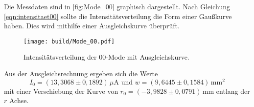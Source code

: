 Die Messdaten sind in \autoref{fig:Mode_00} graphisch dargestellt. Nach Gleichung \ref{eqn:intensitaet00} sollte die Intensitätsverteilung die Form einer Gaußkurve haben. Dies wird mithilfe einer Ausgleichskurve überprüft. 

\begin{figure}[h]
    \centering
    \texttt{[image: build/Mode\_00.pdf]}
    \caption{Intensitätsverteilung der 00-Mode mit Ausgleichskurve.}
    \label{fig:Mode_00}
\end{figure}
Aus der Ausgleichsrechnung ergeben sich die Werte 
\begin{equation*}
    I_0 = (13{,}3068 \pm 0{,}1892) \, \unit{\mu\ampere} \,\, \text{und} \,\, w = (9{,}6445 \pm 0{,}1584) \, \unit{\milli\meter\squared}
\end{equation*}
mit einer Verschiebung der Kurve von $r_0 = (-3{,}9828 \pm 0{,}0791)\, \unit{\milli\meter}$ entlang der $r$ Achse.
\FloatBarrier 


